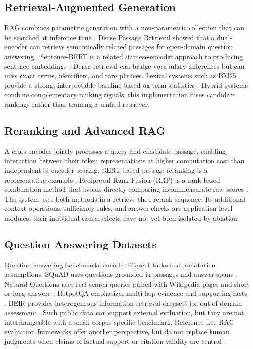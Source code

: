 \documentclass[conference]{IEEEtran}
\begin{document}
\subsection{Retrieval-Augmented Generation}
RAG combines parametric generation with a non-parametric collection that can
be searched at inference time \cite{lewis2020rag}. Dense Passage Retrieval
showed that a dual-encoder can retrieve semantically related passages for
open-domain question answering \cite{karpukhin2020dpr}. Sentence-BERT is a
related siamese-encoder approach to producing sentence embeddings
\cite{reimers2019sbert}. Dense retrieval can bridge vocabulary differences
but can miss exact terms, identifiers, and rare phrases. Lexical systems such
as BM25 provide a strong, interpretable baseline based on term statistics
\cite{robertson2009bm25}. Hybrid systems combine
complementary ranking signals; this implementation fuses candidate rankings
rather than training a unified retriever.

\subsection{Reranking and Advanced RAG}
A cross-encoder jointly processes a query and candidate passage, enabling
interaction between their token representations at higher computation cost
than independent bi-encoder scoring. BERT-based passage reranking is a
representative example \cite{nogueira2019passage}. Reciprocal Rank Fusion
(RRF) is a rank-based combination method that avoids directly comparing
incommensurate raw scores \cite{cormack2009rrf}. The system uses both methods
in a retrieve-then-rerank sequence. Its additional context operations,
sufficiency rules, and answer checks are application-level modules; their
individual causal effects have not yet been isolated by ablation.

\subsection{Question-Answering Datasets}
Question-answering benchmarks encode different tasks and annotation
assumptions. SQuAD uses questions grounded in passages and answer spans
\cite{rajpurkar2016squad}; Natural Questions uses real search queries paired
with Wikipedia pages and short or long answers \cite{kwiatkowski2019nq};
HotpotQA emphasizes multi-hop evidence and supporting facts
\cite{yang2018hotpotqa}. BEIR provides heterogeneous information-retrieval
datasets for out-of-domain assessment \cite{thakur2021beir}. Such public data
can support external evaluation, but they are not interchangeable with a
small corpus-specific benchmark. Reference-free RAG evaluation frameworks
offer another perspective, but do not replace human judgments when claims of
factual support or citation validity are central \cite{es2023ragas}.
\end{document}
